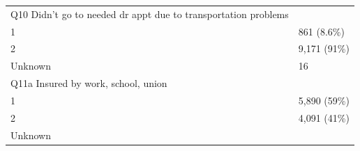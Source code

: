 \documentclass[]{article}
\begin{document}
\begin{longtable}[]{@{}ll@{}}
\begin{minipage}[t]{0.71\columnwidth}\raggedright
Q10 Didn't go to needed dr appt due to transportation problems\strut
\end{minipage} & \begin{minipage}[t]{0.23\columnwidth}\raggedright
\strut
\end{minipage}\tabularnewline
\begin{minipage}[t]{0.71\columnwidth}\raggedright
1\strut
\end{minipage} & \begin{minipage}[t]{0.23\columnwidth}\raggedright
861 (8.6\%)\strut
\end{minipage}\tabularnewline
\begin{minipage}[t]{0.71\columnwidth}\raggedright
2\strut
\end{minipage} & \begin{minipage}[t]{0.23\columnwidth}\raggedright
9,171 (91\%)\strut
\end{minipage}\tabularnewline
\begin{minipage}[t]{0.71\columnwidth}\raggedright
Unknown\strut
\end{minipage} & \begin{minipage}[t]{0.23\columnwidth}\raggedright
16\strut
\end{minipage}\tabularnewline
\begin{minipage}[t]{0.71\columnwidth}\raggedright
Q11a Insured by work, school, union\strut
\end{minipage} & \begin{minipage}[t]{0.23\columnwidth}\raggedright
\strut
\end{minipage}\tabularnewline
\begin{minipage}[t]{0.71\columnwidth}\raggedright
1\strut
\end{minipage} & \begin{minipage}[t]{0.23\columnwidth}\raggedright
5,890 (59\%)\strut
\end{minipage}\tabularnewline
\begin{minipage}[t]{0.71\columnwidth}\raggedright
2\strut
\end{minipage} & \begin{minipage}[t]{0.23\columnwidth}\raggedright
4,091 (41\%)\strut
\end{minipage}\tabularnewline
\begin{minipage}[t]{0.71\columnwidth}\raggedright
Unknown\strut
\end{minipage} & \begin{minipage}[t]{0.23\columnwidth}\raggedright

\end{minipage}
\end{longtable}
\end{document}
